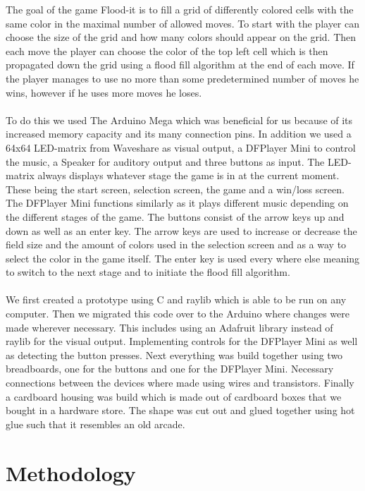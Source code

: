 \documentclass[10pt, a4paper]{article}
\begin{document}
The goal of the game Flood-it is to fill a grid of differently colored cells with the same color in the maximal number of allowed moves. To start with the player can choose the size of the grid and how many colors should appear on the grid. Then each move the player can choose the color of the top left cell which is then propagated down the grid using a flood fill algorithm at the end of each move. If the player manages to use no more than some predetermined number of moves he wins, however if he uses more moves he loses.\\\\
To do this we used The Arduino Mega which was beneficial for us because of its increased memory capacity and its many connection pins. In addition we used a 64x64 LED-matrix from Waveshare as visual output, a DFPlayer Mini to control the music, a Speaker for auditory output and three buttons as input. The LED-matrix always displays whatever stage the game is in at the current moment. These being the start screen, selection screen, the game and a win/loss screen. The DFPlayer Mini functions similarly as it plays different music depending on the different stages of the game. The buttons consist of the arrow keys up and down as well as an enter key. The arrow keys are used to increase or decrease the field size and the amount of colors used in the selection screen and as a way to select the color in the game itself. The enter key is used every where else meaning to switch to the next stage and to initiate the flood fill algorithm.\\\\
We first created a prototype using C and raylib which is able to be run on any computer. Then we migrated this code over to the Arduino where changes were made wherever necessary. This includes using an Adafruit library instead of raylib for the visual output. Implementing controls for the DFPlayer Mini as well as detecting the button presses. Next everything was build together using two breadboards, one for the buttons and one for the DFPlayer Mini. Necessary connections between the devices where made using wires and transistors. Finally a cardboard housing was build which is made out of cardboard boxes that we bought in a hardware store. The shape was cut out and glued together using hot glue such that it resembles an old arcade.

\section*{Methodology}
\end{document}
